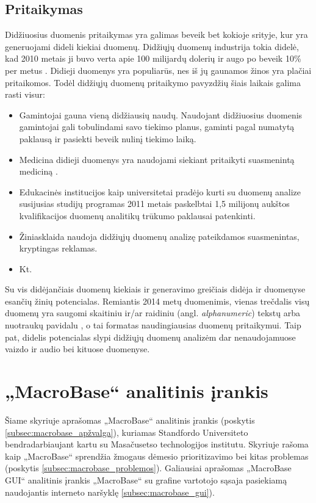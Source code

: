\documentclass{VUMIFPSkursinis}
\begin{document}
\subsection{Pritaikymas} \label{subsec:pritaikymas}
Didžiuosius duomenis pritaikymas yra galimas beveik bet kokioje srityje, kur yra generuojami dideli kiekiai duomenų. Didžiųjų duomenų industrija tokia didelė, kad 2010 metais ji buvo verta apie 100 milijardų dolerių ir augo po beveik 10\% per metus \cite{bigdata_industry}. Didieji duomenys yra populiarūs, nes iš jų gaunamos žinos yra plačiai pritaikomos. Todėl didžiųjų duomenų pritaikymo pavyzdžių šiais laikais galima rasti visur:
\begin{itemize}
\item Gamintojai gauna vieną didžiausių naudų. Naudojant didžiuosius duomenis gamintojai gali tobulindami savo tiekimo planus, gaminti pagal numatytą paklausą ir pasiekti beveik nulinį tiekimo laiką.
\item Medicina didieji duomenys yra naudojami siekiant pritaikyti suasmenintą mediciną \cite{in_medicine}.
\item Edukacinės institucijos kaip universitetai pradėjo kurti su duomenų analize susijusias studijų programas 2011 metais paskelbtai 1,5 milijonų aukštos kvalifikacijos duomenų analitikų trūkumo \cite{shortage} paklausai patenkinti.
\item Žiniasklaida naudoja didžiųjų duomenų analizę pateikdamos suasmenintas, kryptingas reklamas.
\item Kt.
\end{itemize}
Su vis didėjančiais duomenų kiekiais ir generavimo greičiais didėja ir duomenyse esančių žinių potencialas. Remiantis 2014 metų duomenimis, vienas trečdalis visų duomenų yra saugomi skaitiniu ir/ar raidiniu (angl. \textit{alphanumeric}) tekstų arba nuotraukų pavidalu \cite{one_third}, o tai formatas naudingiausias duomenų pritaikymui. Taip pat, didelis potencialas slypi didžiųjų duomenų analizėm dar nenaudojamuose vaizdo ir audio bei kituose duomenyse.

\section{„MacroBase“ analitinis įrankis} \label{sec:macro}
Šiame skyriuje aprašomas „MacroBase“ analitinis įrankis (poskytis \ref{subsec:macrobase_apžvalga}), kuriamas Standfordo Universiteto bendradarbiaujant kartu su Masačusetso technologijos institutu. Skyriuje rašoma kaip „MacroBase“ sprendžia žmogaus dėmesio prioritizavimo bei kitas problemas (poskytis \ref{subsec:macrobase_problemos}). Galiausiai aprašomas „MacroBase GUI“ analitinis įrankis „MacroBase“ su grafine vartotojo sąsaja pasiekiamą naudojantis interneto naršyklę \ref{subsec:macrobase_gui}).
\end{document}
